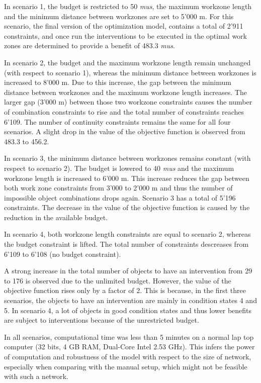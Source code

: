 \documentclass[10pt]{article}
\begin{document}
In scenario 1, the budget is restricted to 50 \textit{mus}, the maximum workzone
length and the minimum distance between workzones are set to 5'000 m. For this
scenario, the final version of the optimization model, contains a total of 2'911
constraints, and once run the interventions to be executed in the optimal work
zones are determined to provide a benefit of 483.3 \textit{mus}.

In scenario 2, the budget and the maximum workzone length remain unchanged (with
respect to scenario 1), whereas the minimum distance between workzones is
increased to 8'000 m. Due to this increase, the gap between the minimum distance
between workzones and the maximum workzone length increases. The larger gap
(3'000 m) between those two workzone constraints causes the number of combination
constraints to rise and the total number of constraints reaches 6'109. The number
of continuity constraints remains the same for all four scenarios. A slight drop
in the value of the objective function is observed from 483.3 to 456.2.

In scenario 3, the minimum distance between workzones remains constant (with
respect to scenario 2). The budget is lowered to 40 \textit{mus} and the maximum
workzone length is increased to 6'000 m. This increase reduces the gap between
both work zone constraints from 3'000 to 2'000 m and thus the number of
impossible object combinations drops again. Scenario 3 has a total of 5'196
constraints. The decrease in the value of the objective function is caused by the
reduction in the available budget.

In scenario 4, both workzone length constraints are equal to scenario 2, whereas
the budget constraint is lifted. The total number of constraints descreases from
6'109 to 6'108 (no budget constraint).

A strong increase in the total number of objects to have an intervention from 29
to 176 is observed due to the unlimited budget. However, the value of the
objective function rises only by a factor of 2. This is because, in the first
three scenarios, the objects to have an intervention are mainly in condition
states 4 and 5. In scenario 4, a lot of objects in good condition states and thus
lower benefits are subject to interventions because of the unrestricted budget.

In all scenarios, computational time was less than 5 minutes on a normal lap top
computer (32 bits, 4 GB RAM, Dual-Core Intel 2.53 GHz). This infers the power of
computation and robustness of the model with respect to the size of network,
especially when comparing with the manual setup, which might not be feasible with
such a network.
\end{document}
